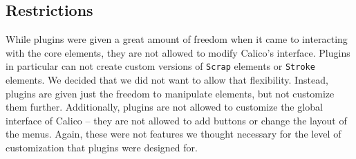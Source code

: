 \subsection*{Restrictions}
While plugins were given a great amount of freedom when it came to interacting with the core elements, they are not allowed to modify Calico's interface. Plugins in particular can not create custom versions of \texttt{Scrap} elements or \texttt{Stroke} elements. We decided that we did not want to allow that flexibility. Instead, plugins are given just the freedom to manipulate elements, but not customize them further. Additionally, plugins are not allowed to customize the global interface of Calico -- they are not allowed to add buttons or change the layout of the menus. Again, these were not features we thought necessary for the level of customization that plugins were designed for.